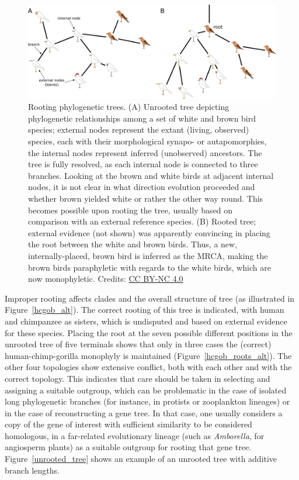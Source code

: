\begin{figure}[!htbp]
\centering
\includegraphics[width=1\linewidth]{files/rooted-trees_alt-abf4afb0f1bb4c4bc682994b349c3d24.pdf}
\caption[]{Rooting phylogenetic trees.
(A) Unrooted tree depicting phylogenetic relationships among a set of white and brown bird species; external nodes represent the extant (living, observed) species, each with their morphological synapo- or autapomorphies, the internal nodes represent inferred (unobserved) ancestors.
The tree is fully resolved, as each internal node is connected to three branches.
Looking at the brown and white birds at adjacent internal nodes, it is not clear in what direction evolution proceeded and whether brown yielded white or rather the other way round.
This becomes possible upon rooting the tree, usually based on comparison with an external reference species.
(B) Rooted tree; external evidence (not shown) was apparently convincing in placing the root between the white and brown birds.
Thus, a new, internally-placed, brown bird is inferred as the MRCA, making the brown birds paraphyletic with regards to the white birds, which are now monophyletic.
Credits: \href{https://creativecommons.org/licenses/by-nc/4.0/}{CC BY-NC 4.0} \cite{own_3_2024}}
\label{rooted_trees_alt}
\end{figure}

Improper rooting affects clades and the overall structure of tree (as illustrated in Figure~\ref{hcgob_alt}).
The correct rooting of this tree is indicated, with human and chimpanzee as sisters, which is undisputed and based on external evidence for these species.
Placing the root at the seven possible different positions in the unrooted tree of five terminals shows that only in three cases the (correct) human-chimp-gorilla monophyly is maintained (Figure~\ref{hcgob_roots_alt}).
The other four topologies show extensive conflict, both with each other and with the correct topology.
This indicates that care should be taken in selecting and assigning a suitable outgroup, which can be problematic in the case of isolated long phylogenetic branches (for instance, in protists or zooplankton lineages) or in the case of reconstructing a gene tree.
In that case, one usually considers a copy of the gene of interest with sufficient similarity to be considered homologous, in a far-related evolutionary lineage (such as \textit{Amborella}, for angiosperm plants) as a suitable outgroup for rooting that gene tree.
Figure~\ref{unrooted_tree} shows an example of an unrooted tree with additive branch lengths.

